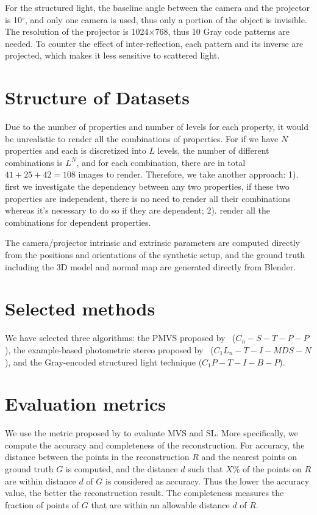 For the structured light, the baseline angle between the camera and the projector is 10$^\circ$, and only one camera is used, thus only a portion of the object is invisible. The resolution of the projector is 1024$\times$768, thus 10 Gray code patterns are needed. To counter the effect of inter-reflection, each pattern and its inverse are projected, which makes it less sensitive to scattered light.

\section{Structure of Datasets}
Due to the number of properties and number of levels for each property, it would be unrealistic to render all the combinations of properties. For if we have $N$ properties and each is discretized into $L$ levels, the number of different combinations is $L^N$, and for each combination, there are in total $41+25+42=108$ images to render. Therefore, we take another approach: 1). first we investigate the dependency between any two properties, if these two properties are independent, there is no need to render all their combinations whereas it's necessary to do so if they are dependent; 2). render all the combinations for dependent properties.

The camera/projector intrinsic and extrinsic parameters are computed directly from the positions and orientations of the synthetic setup, and the ground truth including the 3D model and normal map are generated directly from Blender.

\section{Selected methods}
We have selected three algorithms: the PMVS proposed by~\citeauthor{furukawa2010accurate} ($C_n-S-T-P-P$), the example-based photometric stereo proposed by~\citeauthor{hertzmann2005example} ($C_1L_n-T-I-MDS-N$), and the Gray-encoded structured light technique ($C_1P-T-I-B-P$).

\section{Evaluation metrics}
We use the metric proposed by \citeauthor{seitz2006comparison} to evaluate MVS and SL. More specifically, we compute the accuracy and completeness of the reconstruction. For accuracy, the distance between the points in the reconstruction $R$ and the nearest points on ground truth $G$ is computed, and the distance $d$ such that $X\%$ of the points on $R$ are within distance $d$ of $G$ is considered as accuracy. Thus the lower the accuracy value, the better the reconstruction result. The completeness measures the fraction of points of $G$ that are within an allowable distance $d$ of $R$.

